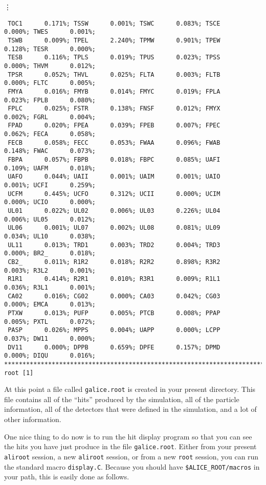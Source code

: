 \vdots
\scriptsize
\begin{verbatim}
 TOC1      0.171%; TSSW      0.001%; TSWC      0.083%; TSCE      0.000%; TWES      0.001%;
 TSWB      0.009%; TPEL      2.240%; TPMW      0.901%; TPEW      0.128%; TESR      0.000%;
 TESB      0.116%; TPLS      0.019%; TPUS      0.023%; TPSS      0.000%; THVM      0.012%;
 TPSR      0.052%; THVL      0.025%; FLTA      0.003%; FLTB      0.000%; FLTC      0.005%;
 FMYA      0.016%; FMYB      0.014%; FMYC      0.019%; FPLA      0.023%; FPLB      0.080%;
 FPLC      0.025%; FSTR      0.138%; FNSF      0.012%; FMYX      0.002%; FGRL      0.004%;
 FPAD      0.020%; FPEA      0.039%; FPEB      0.007%; FPEC      0.062%; FECA      0.058%;
 FECB      0.058%; FECC      0.053%; FWAA      0.096%; FWAB      0.148%; FWAC      0.073%;
 FBPA      0.057%; FBPB      0.018%; FBPC      0.085%; UAFI      0.109%; UAFM      0.018%;
 UAFO      0.044%; UAII      0.001%; UAIM      0.001%; UAIO      0.001%; UCFI      0.259%;
 UCFM      0.445%; UCFO      0.312%; UCII      0.000%; UCIM      0.000%; UCIO      0.000%;
 UL01      0.022%; UL02      0.006%; UL03      0.226%; UL04      0.006%; UL05      0.012%;
 UL06      0.001%; UL07      0.002%; UL08      0.081%; UL09      0.034%; UL10      0.038%;
 UL11      0.013%; TRD1      0.003%; TRD2      0.004%; TRD3      0.000%; BR2_      0.018%;
 CB2_      0.011%; R1R2      0.018%; R2R2      0.898%; R3R2      0.003%; R3L2      0.001%;
 R1R1      0.414%; R2R1      0.010%; R3R1      0.009%; R1L1      0.036%; R3L1      0.001%;
 CA02      0.016%; CG02      0.000%; CA03      0.042%; CG03      0.000%; EMCA      0.013%;
 PTXW      0.013%; PUFP      0.005%; PTCB      0.008%; PPAP      0.005%; PXTL      0.072%;
 PASP      0.026%; MPPS      0.004%; UAPP      0.000%; LCPP      0.037%; DW11      0.000%;
 DV11      0.000%; DPPB      0.659%; DPFE      0.157%; DPMD      0.000%; DIQU      0.016%;
***************************************************************************
root [1] 
\end{verbatim}
\normalsize

At this point a file called \texttt{galice.root} is created in your present
directory. This file contains all of the ``hits'' produced by the simulation,
all of the particle information, all of the detectors that were defined in the
simulation, and a lot of other information.

One nice thing to do now is to run the hit display program so that you can see
the hits you have just produce in the file \texttt{galice.root}. Either from
your present \texttt{aliroot} session, a new \texttt{aliroot} session, or
from a new \texttt{root} session, you can run the standard macro
\texttt{display.C}. Because you should have \texttt{\$ALICE\_ROOT/macros} in
your path, this is easily done as follows.

